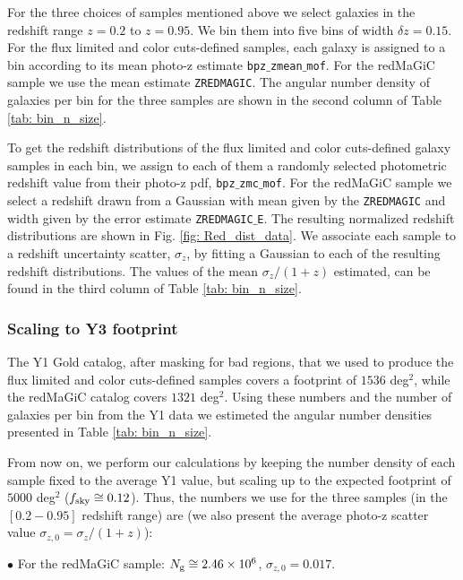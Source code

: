 \documentclass[a4paper,fleqn,usenatbib]{mnras}
\begin{document}
For the three choices of samples mentioned above we select galaxies in the redshift range $z=0.2$ to $z=0.95$. We bin them into five bins of width $\delta z  = 0.15$. For the flux limited and color cuts-defined samples, each galaxy is assigned to a bin according to its mean photo-z estimate \texttt{bpz$\_$zmean$\_$mof}. For the redMaGiC sample we use the mean estimate  \texttt{ZREDMAGIC}. The angular number density of galaxies per bin for the three samples are shown in the second column of Table \ref{tab: bin_n_size}.

To get the redshift distributions of the flux limited and color cuts-defined  galaxy samples in each bin, we assign to each of them a randomly selected photometric redshift value from their photo-z pdf,  \texttt{bpz$\_$zmc$\_$mof}. For the redMaGiC sample we select a redshift drawn from a Gaussian with mean given by the \texttt{ZREDMAGIC} and width given by the error estimate  \texttt{ZREDMAGIC$\_$E}. The resulting normalized redshift distributions are shown in Fig. \ref{fig: Red_dist_data}. We associate each sample to a redshift uncertainty scatter, $\sigma_z$, by fitting a Gaussian to each of the resulting redshift distributions. The values of the mean $\sigma_z/(1+z)$ estimated, can be found in the third column of Table \ref{tab: bin_n_size}.

\subsubsection{Scaling to Y3 footprint}
\label{subsub: scaling}

The Y1 Gold catalog, after masking for bad regions, that we used to produce the flux limited and color cuts-defined samples covers a footprint of $1536$ deg$^2$, while the redMaGiC catalog covers $1321$ deg$^2$. Using these numbers and the number of galaxies per bin from the Y1 data we estimeted the angular number densities presented in Table \ref{tab: bin_n_size}.

From now on, we perform our calculations by keeping the number density of each sample fixed to the average Y1 value, but scaling up to the expected footprint of $5000$ deg$^2$ ($f_{\mbox{\scriptsize{sky}}} \cong 0.12$). Thus, the numbers we use for the three samples (in the $[0.2-0.95]$ redshift range) are (we also present the average photo-z scatter value $\sigma_{z,0} = \sigma_z/(1+z)$):

$\bullet$ For the redMaGiC sample: $N_{\mbox{\scriptsize{g}}} \cong 2.46 \times 10^6$, $\sigma_{z,0} = 0.017$.
\end{document}
